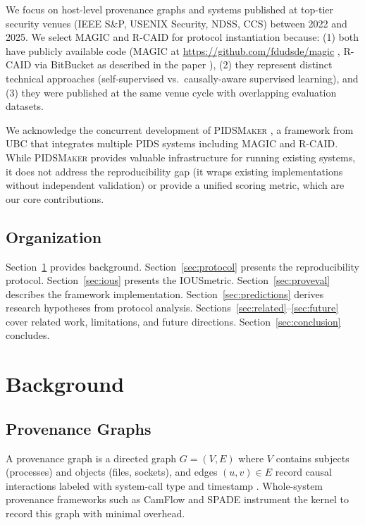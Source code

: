 \documentclass[11pt,a4paper]{article}
\newcommand{\system}[1]{\textsc{#1}}
\newcommand{\ious}{\textsc{IOUS}}
\begin{document}
We focus on host-level provenance graphs and systems published at top-tier security venues (IEEE S\&P, USENIX Security, NDSS, CCS) between 2022 and 2025. We select \system{MAGIC} and \system{R-CAID} for protocol instantiation because: (1) both have publicly available code (MAGIC at \url{https://github.com/fdudsde/magic} \cite{jia2024magic}, R-CAID via BitBucket as described in the paper \cite{goyal2024rcaid}), (2) they represent distinct technical approaches (self-supervised vs.\ causally-aware supervised learning), and (3) they were published at the same venue cycle with overlapping evaluation datasets.

We acknowledge the concurrent development of \system{PIDSMaker} \cite{bilot2025pidsmaker}, a framework from UBC that integrates multiple PIDS systems including MAGIC and R-CAID. While \system{PIDSMaker} provides valuable infrastructure for running existing systems, it does not address the reproducibility gap (it wraps existing implementations without independent validation) or provide a unified scoring metric, which are our core contributions.

\subsection{Organization}

Section~\ref{sec:background} provides background. Section~\ref{sec:protocol} presents the reproducibility protocol. Section~\ref{sec:ious} presents the \ious metric. Section~\ref{sec:proveval} describes the framework implementation. Section~\ref{sec:predictions} derives research hypotheses from protocol analysis. Sections~\ref{sec:related}--\ref{sec:future} cover related work, limitations, and future directions. Section~\ref{sec:conclusion} concludes.

\section{Background}
\label{sec:background}

\subsection{Provenance Graphs}

A provenance graph is a directed graph $G = (V, E)$ where $V$ contains subjects (processes) and objects (files, sockets), and edges $(u, v) \in E$ record causal interactions labeled with system-call type and timestamp \cite{han2020unicorn}. Whole-system provenance frameworks such as CamFlow and SPADE instrument the kernel to record this graph with minimal overhead.
\end{document}
